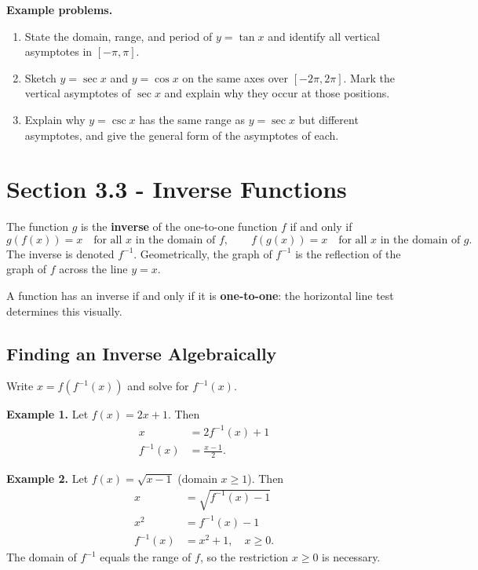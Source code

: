 \textbf{Example problems.}
\begin{enumerate}
    \item State the domain, range, and period of $y = \tan x$ and identify all vertical asymptotes in $[-\pi, \pi]$.
    \item Sketch $y = \sec x$ and $y = \cos x$ on the same axes over $[-2\pi, 2\pi]$. Mark the vertical asymptotes of $\sec x$ and explain why they occur at those positions.
    \item Explain why $y = \csc x$ has the same range as $y = \sec x$ but different asymptotes, and give the general form of the asymptotes of each.
\end{enumerate}

\section{Section 3.3 - Inverse Functions}
\label{sec:sect-f100}

The function $g$ is the \textbf{inverse} of the one-to-one function $f$ if
and only if
\[
  g(f(x)) = x \quad \text{for all } x \text{ in the domain of } f, \qquad
  f(g(x)) = x \quad \text{for all } x \text{ in the domain of } g.
\]
The inverse is denoted $f^{-1}$.  Geometrically, the graph of $f^{-1}$ is the
reflection of the graph of $f$ across the line $y = x$.

A function has an inverse if and only if it is \textbf{one-to-one}: the
horizontal line test determines this visually.

\subsection*{Finding an Inverse Algebraically}

Write $x = f(f^{-1}(x))$ and solve for $f^{-1}(x)$.

\textbf{Example 1.} Let $f(x) = 2x + 1$.  Then
\begin{align}
  x &= 2f^{-1}(x) + 1 \\
  f^{-1}(x) &= \frac{x - 1}{2}.
\end{align}

\textbf{Example 2.} Let $f(x) = \sqrt{x - 1}$ (domain $x \geq 1$).  Then
\begin{align}
  x &= \sqrt{f^{-1}(x) - 1} \\
  x^{2} &= f^{-1}(x) - 1 \\
  f^{-1}(x) &= x^{2} + 1, \quad x \geq 0.
\end{align}
The domain of $f^{-1}$ equals the range of $f$, so the restriction $x \geq 0$
is necessary.

